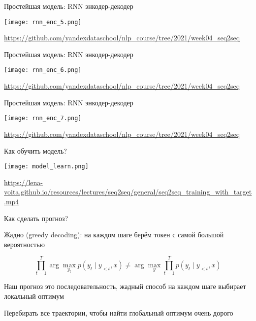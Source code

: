 \documentclass[notes,12pt, aspectratio=169]{beamer}
\newenvironment{wideitemize}{\itemize\addtolength{\itemsep}{10pt}}{\enditemize}
\begin{document}
\begin{frame}{Простейшая модель: RNN энкодер-декодер}
	\begin{center}
		\texttt{[image: rnn\_enc\_5.png]}
	\end{center}
	\vfill
	\footnotesize  {\color{blue} \url{https://github.com/yandexdataschool/nlp_course/tree/2021/week04_seq2seq}} 
\end{frame} 


\begin{frame}{Простейшая модель: RNN энкодер-декодер}
	\begin{center}
		\texttt{[image: rnn\_enc\_6.png]}
	\end{center}
	\vfill
	\footnotesize  {\color{blue} \url{https://github.com/yandexdataschool/nlp_course/tree/2021/week04_seq2seq}} 
\end{frame} 


\begin{frame}{Простейшая модель: RNN энкодер-декодер}
	\begin{center}
		\texttt{[image: rnn\_enc\_7.png]}
	\end{center}
	\vfill
	\footnotesize  {\color{blue} \url{https://github.com/yandexdataschool/nlp_course/tree/2021/week04_seq2seq}} 
\end{frame} 



\begin{frame}{Как обучить модель?}
	\begin{center}
		\texttt{[image: model\_learn.png]}
	\end{center}
	\vfill
	\scriptsize  {\color{blue} \url{https://lena-voita.github.io/resources/lectures/seq2seq/general/seq2seq_training_with_target.mp4}} 
\end{frame} 


\begin{frame}{Как сделать прогноз?}
	\begin{wideitemize} 
		\item  \alert{Жадно (greedy decoding):}  на каждом шаге берём токен с самой большой вероятностью
		
		\[ 
		\prod_{t=1}^T \arg \max_{y_t} p(y_t \mid y_{<t}, x)  \ne  \arg \max_{y}  \prod_{t=1}^T p(y_t \mid y_{<t}, x) 
		\]
		
		\item  Наш прогноз это последовательность, жадный способ на каждом шаге выбирает локальный оптимум
		
		\item  Перебирать все траектории, чтобы найти глобальный оптимум очень дорого
	\end{wideitemize} 

\end{frame} 
\end{document}
